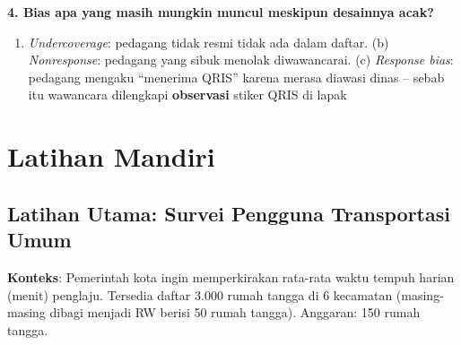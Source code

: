 \documentclass[
  indonesian,
  letterpaper,
]{book}
\providecommand{\tightlist}{%
  \setlength{\itemsep}{0pt}\setlength{\parskip}{0pt}}
\begin{document}
\textbf{4. Bias apa yang masih mungkin muncul meskipun desainnya acak?}

\begin{enumerate}
\def\labelenumi{(\alph{enumi})}
\tightlist
\item
  \emph{Undercoverage}: pedagang tidak resmi tidak ada dalam daftar. (b)
  \emph{Nonresponse}: pedagang yang sibuk menolak diwawancarai. (c)
  \emph{Response bias}: pedagang mengaku ``menerima QRIS'' karena merasa
  diawasi dinas -- sebab itu wawancara dilengkapi \textbf{observasi}
  stiker QRIS di lapak
\end{enumerate}

\section{Latihan Mandiri}\label{latihan-mandiri-2}

\subsection{Latihan Utama: Survei Pengguna Transportasi
Umum}\label{latihan-utama-survei-pengguna-transportasi-umum}

\textbf{Konteks}: Pemerintah kota ingin memperkirakan rata-rata waktu
tempuh harian (menit) penglaju. Tersedia daftar 3.000 rumah tangga di 6
kecamatan (masing-masing dibagi menjadi RW berisi 50 rumah tangga).
Anggaran: 150 rumah tangga.
\end{document}

